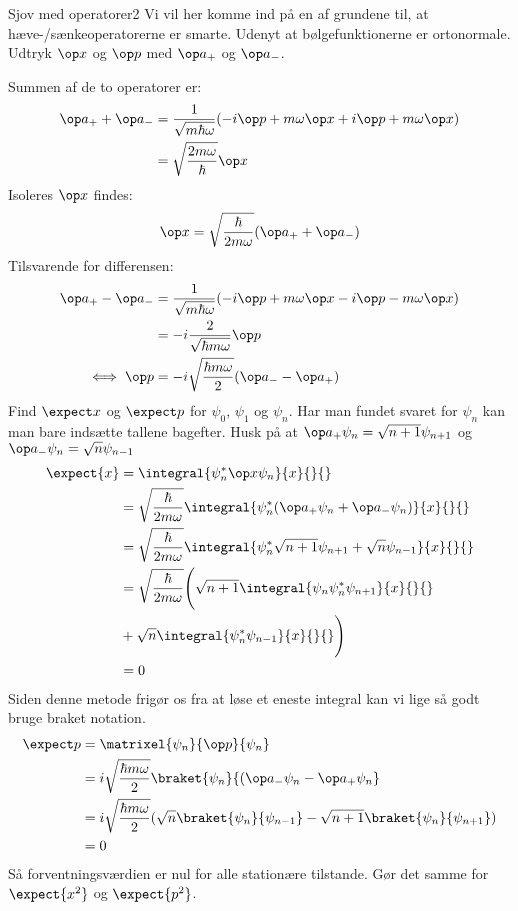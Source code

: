\begin{opgave}{Sjov med operatorer}{2}
\label{kvant:opg:sjov}
Vi vil her komme ind på en af grundene til, at hæve-/sænkeoperatorerne er smarte. Udenyt at bølgefunktionerne er ortonormale.
\opg Udtryk $\op x$ og $\op p$ med $\op a_+$ og $\op a_-$.

Summen af de to operatorer er:
\begin{align*}
\op a_++\op a_- &= \frac{1}{\sqrt{m\hbar\omega}}(-i\op p+m\omega \op x+i\op p+m\omega\op x)\\
&=\sqrt{\frac{2m\omega}{\hbar}}\op x
\end{align*}
Isoleres $\op x$ findes:
$$
\op x = \sqrt{\frac{\hbar}{2m\omega}}(\op a_++\op a_-)
$$
Tilsvarende for differensen:
\begin{align*}
    \op a_+-\op a_- &= \frac{1}{\sqrt{m\hbar\omega}}(-i\op p+m\omega\op x-i\op p-m\omega\op x)\\
    &= -i\frac{2}{\sqrt{\hbar m\omega}}\op p\\
    \iff \op p &= -i\sqrt{\frac{\hbar m\omega}{2}}(\op a_--\op a_+)
\end{align*}
\opg Find $\expect x$ og $\expect p$ for $\psi_0$, $\psi_1$ og $\psi_{n}$.
Har man fundet svaret for $\psi_n$ kan man bare indsætte tallene bagefter.
Husk på at $\op a_+\psi_n = \sqrt{n+1}\psi_{n+1}$ og $\op a_-\psi_n = \sqrt{n}\psi_{n-1}$
\begin{align*}
    \expect{x} &= \integral{\psi_n^*\op x \psi_n}{x}{}{}\\
    &= \sqrt{\frac{\hbar}{2m\omega}}\integral{\psi_n^*(\op a_+\psi_n+\op a_-\psi_n)}{x}{}{}\\
    &= \sqrt{\frac{\hbar}{2m\omega}}\integral{\psi_n^*\sqrt{n+1}\psi_{n+1}+\sqrt{n}\psi_{n-1}}{x}{}{}\\
    &= \sqrt{\frac{\hbar}{2m\omega}}\Bigg(\sqrt{n+1}\integral{\psi_n\psi_n^*\psi_{n+1}}{x}{}{}\\
    &+\sqrt{n}\integral{\psi_n^*\psi_{n-1}}{x}{}{}\Bigg)\\
    &= 0
\end{align*}
Siden denne metode frigør os fra at løse et eneste integral kan vi lige så godt bruge braket notation.
\begin{align*}
    \expect p &= \matrixel{\psi_n}{\op p}{\psi_n}\\
    &= i\sqrt{\frac{\hbar m\omega}{2} }\braket{\psi_n}{(\op a_-\psi_n-\op a_+\psi_n}\\
    &= i\sqrt{\frac{\hbar m\omega}{2}}(\sqrt{n}\braket{\psi_n}{\psi_{n-1}}-\sqrt{n+1}\braket{\psi_n}{\psi_{n+1}})\\
    &=0
\end{align*}
Så forventningsværdien er nul for alle stationære tilstande.
\opg Gør det samme for $\expect{x^2}$ og $\expect{p^2}$.


\end{opgave}
